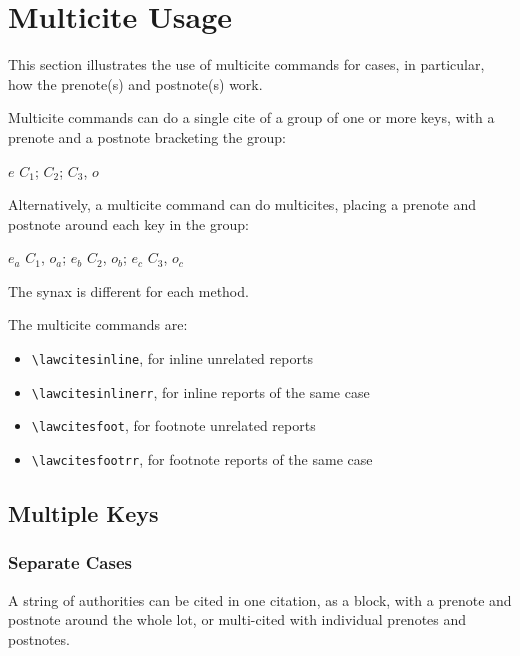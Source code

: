 \section{Multicite Usage}
This section illustrates the use of multicite commands for cases, in particular, how the prenote(s) and postnote(s) work.

Multicite commands can do a single cite of a group of one or more keys, with a prenote and a postnote bracketing the group:

\begin{center}
\colorbox{yellow!12}{$e$ $C_1$; $C_2$; $C_3$, $o$}
\end{center}

Alternatively, a multicite command can do multicites, placing a prenote and postnote around each key in the group:

\begin{center}
\colorbox{yellow!12}{$e_a$ $C_1$, $o_a$; $e_b$ $C_2$, $o_b$; $e_c$ $C_3$, $o_c$}
\end{center}

The synax is different for each method.

The multicite commands are: 
\begin{itemize}
\item[] \verb|\lawcitesinline|, for inline unrelated reports
\item[] \verb|\lawcitesinlinerr|, for inline reports of the same case
\item[] \verb|\lawcitesfoot|, for footnote unrelated reports
\item[] \verb|\lawcitesfootrr|, for footnote reports of the same case
\end{itemize}


\subsection{Multiple Keys}
\subsubsection{Separate Cases}
A string of authorities can be cited in one citation, as a block, with a prenote and postnote around the whole lot, or multi-cited with individual prenotes and postnotes.

